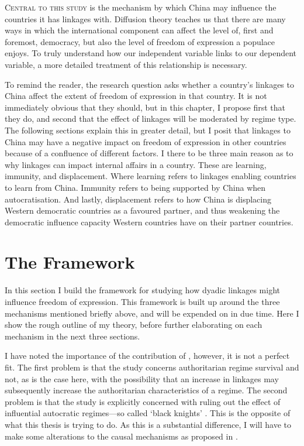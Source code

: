 \lettrine{C}{entral to this study} is the mechanism by which China may influence the countries it has linkages with. Diffusion theory teaches us that there are many ways in which the international component can affect the level of, first and foremost, democracy, but also the level of freedom of expression a populace enjoys. To truly understand how our independent variable links to our dependent variable, a more detailed treatment of this relationship is necessary.

To remind the reader, the research question asks whether a country's linkages to China affect the extent of freedom of expression in that country. It is not immediately obvious that they should, but in this chapter, I propose first that they do, and second that the effect of linkages will be moderated by regime type. The following sections explain this in greater detail, but I posit that linkages to China may have a negative impact on freedom of expression in other countries because of a confluence of different factors. I there to be three main reason as to why linkages can impact internal affairs in a country. These are learning, immunity, and displacement. Where learning refers to linkages enabling countries to learn from China. Immunity refers to being supported by China when autocratisation. And lastly, displacement refers to how China is displacing Western democratic countries as a favoured partner, and thus weakening the democratic influence capacity Western countries have on their partner countries.

\section{The Framework}
In this section I build the framework for studying how dyadic linkages might influence freedom of expression. This framework is built up around the three mechanisms mentioned briefly above, and will be expended on in due time. Here I show the rough outline of my theory, before further elaborating on each mechanism in the next three sections. 

I have noted the importance of the contribution of \citet{tansey_ties_2017}, however, it is not a perfect fit. The first problem is that the study concerns authoritarian regime survival and not, as is the case here, with the possibility that an increase in linkages may subsequently increase the authoritarian characteristics of a regime. The second problem is that the \citeauthor{tansey_ties_2017} study is explicitly concerned with ruling out the effect of influential autocratic regimes---so called `black knights' \citep[p.1232]{tansey_ties_2017}. This is the opposite of what this thesis is trying to do. As this is a substantial difference, I will have to make some alterations to the causal mechanisms as proposed in \citet{tansey_ties_2017}. 

